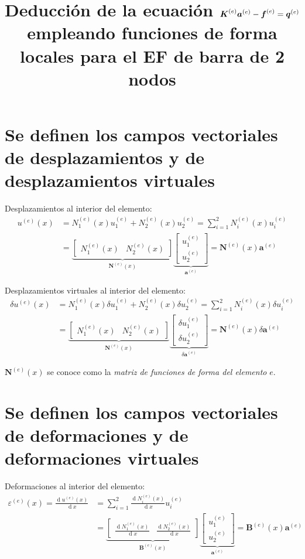 \documentclass[12pt,landscape,letterpaper]{article}
\title{Deducción de la ecuación $\ma{K}^{(e)} \ve{a}^{(e)} - \ma{f}^{(e)} = \ma{q}^{(e)}$ empleando funciones de forma locales para el EF de barra de 2 nodos}
\date{}
\newcommand{\ve}[1]{{\boldsymbol{#1}}}
\newcommand{\ma}[1]{{\boldsymbol{#1}}}
\newcommand{\dd}{\operatorname{d} \!}
\begin{document}
\maketitle

\section{Se definen los campos vectoriales de desplazamientos y  de desplazamientos virtuales}

Desplazamientos al interior del elemento:
\begin{align}
u^{(e)}(x) 
&= N_1^{(e)}(x) u_1^{(e)} + N_2^{(e)}(x) u_2^{(e)} 
= \sum_{i=1}^2 N_i^{(e)}(x) u_i^{(e)} \\
&= 
\underbrace{\begin{bmatrix}
N_1^{(e)}(x) & N_2^{(e)}(x)
\end{bmatrix}}_{\ma{N}^{(e)}(x)}
\underbrace{\begin{bmatrix}
   u_1^{(e)} \\ u_2^{(e)}
   \end{bmatrix}}_{\ma{a}^{(e)}} = \ma{N}^{(e)}(x)  \ve{a}^{(e)}
\end{align}

Desplazamientos virtuales al interior del elemento:
\begin{align}
\delta u^{(e)}(x) 
&= N_1^{(e)}(x) \delta u_1^{(e)} + N_2^{(e)}(x) \delta u_2^{(e)} = \sum_{i=1}^2 N_i^{(e)}(x) \delta u_i^{(e)} \\
&= 
\underbrace{\begin{bmatrix}
   N_1^{(e)}(x) & N_2^{(e)}(x)
   \end{bmatrix}}_{\ma{N}^{(e)}(x)}
\underbrace{\begin{bmatrix}
   \delta u_1^{(e)} \\ \delta u_2^{(e)}
   \end{bmatrix}}_{\delta \ma{a}^{(e)}} = \ma{N}^{(e)}(x) \delta \ve{a}^{(e)}
\end{align}

$\ma{N}^{(e)}(x)$ se conoce como la \emph{matriz de funciones de forma del elemento} $e$.

\newpage

\section{Se definen los campos vectoriales de deformaciones y  de deformaciones virtuales}

Deformaciones al interior del elemento:
\begin{align}
\varepsilon^{(e)}(x) = \frac{\dd u^{(e)}(x)}{\dd x} 
&= \sum_{i=1}^2 \frac{\dd N_i^{(e)}(x)}{\dd x} u_i^{(e)} \\
&= 
\underbrace{\begin{bmatrix}
  \frac{\dd N_1^{(e)}(x)}{\dd x} & \frac{\dd N_2^{(e)}(x)}{\dd x}
   \end{bmatrix}}_{\ma{B}^{(e)}(x)}
\underbrace{\begin{bmatrix}
   u_1^{(e)} \\ u_2^{(e)}
   \end{bmatrix}}_{\ma{a}^{(e)}} = \ma{B}^{(e)}(x)  \ve{a}^{(e)}
\end{align}
\end{document}
